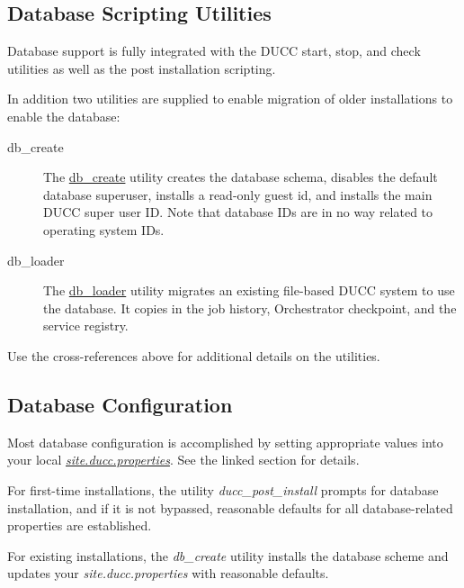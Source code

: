 \subsection{Database Scripting  Utilities}
    Database support is fully integrated with the DUCC start, stop, and check utilities as
    well as the post installation scripting.

    In addition two utilities are supplied to enable migration of older installations to
    enable the database:

    \begin{description}
      \item[db\_create] The \hyperref[subsec:cli.db.create]{db\_create} utility creates the database schema, disables the
        default database superuser, installs a read-only guest id, and installs the
        main DUCC super user ID.  Note that database IDs are in no way related to 
        operating system IDs.
      \item[db\_loader] The \hyperref[subsec:cli.db.loader]{db\_loader} utility migrates an existing file-based DUCC
        system to use the database.  It copies in the job history, Orchestrator checkpoint,
        and the service registry.
    \end{description}
      
    Use the cross-references above for additional details on the utilities.
    
\subsection{Database Configuration}
    Most database configuration is accomplished by setting appropriate values into 
    your local \hyperref[subsec:ducc.database.properties]{\em site.ducc.properties}.  See
    the linked section for details.
    
    For first-time installations, the utility {\em ducc\_post\_install} prompts
    for database installation, and if it is not bypassed, reasonable defaults for
    all database-related properties are established.

    For existing installations, the {\em db\_create} utility installs the
    database scheme and updates your {\em site.ducc.properties} with reasonable
    defaults.
